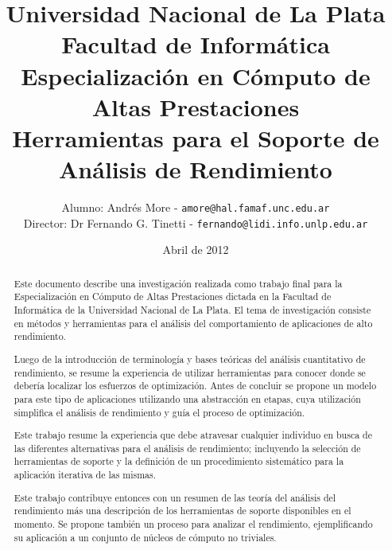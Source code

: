 \documentclass[a4paper]{report}
\begin{document}
\title{Universidad Nacional de La Plata\\Facultad de Inform\'atica\\ \bigskip
  Especializaci\'on en C\'omputo de Altas Prestaciones\\ \bigskip
  Herramientas para el Soporte de An\'alisis de Rendimiento}

\author{
  Alumno: Andr\'es More - {\tt amore@hal.famaf.unc.edu.ar}\\
  Director: Dr Fernando G. Tinetti - {\tt fernando@lidi.info.unlp.edu.ar}
}

\date{Abril de 2012}

\maketitle

\begin{abstract}

  Este documento describe una investigaci\'on realizada como trabajo final para
  la Especializaci\'on en C\'omputo de Altas Prestaciones dictada en la
  Facultad de Inform\'atica de la Universidad Nacional de La Plata.
  El tema de investigaci\'on consiste en m\'etodos y herramientas para
  el an\'alisis del comportamiento de aplicaciones de alto rendimiento.

  \bigskip

  Luego de la introducci\'on de terminolog\'ia y bases te\'oricas del
  an\'alisis cuantitativo de rendimiento, se resume la experiencia de utilizar
  herramientas para conocer donde se deber\'ia localizar los esfuerzos de
  optimizaci\'on. Antes de concluir se propone un modelo para este tipo de
  aplicaciones utilizando una abstracci\'on en etapas, cuya
  utilizaci\'on simplifica el an\'alisis de rendimiento y gu\'ia el proceso de optimizaci\'on.

  \bigskip

  Este trabajo resume la experiencia que debe atravesar cualquier
  individuo en busca de las diferentes alternativas para el an\'alisis de
  rendimiento; incluyendo la selecci\'on de herramientas de soporte y la
  definici\'on de un procedimiento sistem\'atico para la aplicaci\'on iterativa
  de las mismas.

  \bigskip

  Este trabajo contribuye entonces con un resumen de las teor\'ia del an\'alisis del
  rendimiento m\'as una descripci\'on de los herramientas de soporte 
  disponibles en el momento. Se propone tambi\'en un proceso para analizar el
  rendimiento, ejemplificando su aplicaci\'on a un conjunto de n\'ucleos de
  c\'omputo no triviales.

\end{abstract}
\end{document}
